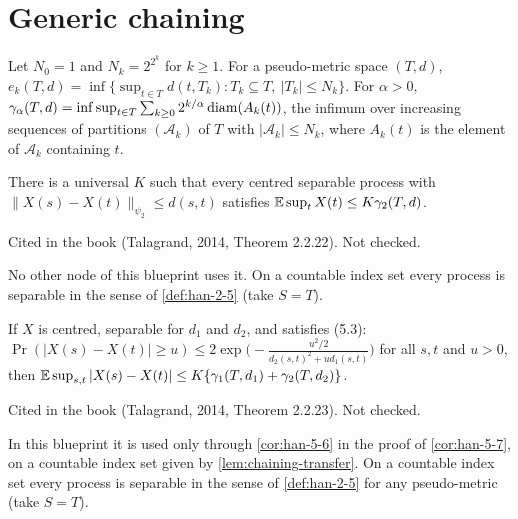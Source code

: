 \section{Generic chaining}

\begin{definition}
  \label{def:han-5-6}
  Let $N_0=1$ and $N_k=2^{2^k}$ for $k\ge1$. For a pseudo-metric space $(T,d)$, $e_k(T,d)=\inf\{\sup_{t\in T}d(t,T_k):T_k\subseteq T,\ |T_k|\le N_k\}$. For $\alpha>0$, $\gamma_\alpha(T,d)=\inf\sup_{t\in T}\sum_{k\ge0}2^{k/\alpha}\operatorname{diam}(A_k(t))$, the infimum over increasing sequences of partitions $(\mathcal A_k)$ of $T$ with $|\mathcal A_k|\le N_k$, where $A_k(t)$ is the element of $\mathcal A_k$ containing $t$.
\end{definition}

\begin{theorem}
  \label{thm:han-5-15}
  There is a universal $K$ such that every centred separable process with $\|X(s)-X(t)\|_{\psi_2}\le d(s,t)$ satisfies $\mathbb{E}\sup_tX(t)\le K\gamma_2(T,d)$.
\end{theorem}
\begin{remark}
  Cited in the book (Talagrand, 2014, Theorem 2.2.22). Not checked.

  No other node of this blueprint uses it. On a countable index set every process is separable in the sense of \cref{def:han-2-5} (take $S=T$).
\end{remark}

\begin{theorem}
  \label{thm:han-5-17}
  If $X$ is centred, separable for $d_1$ and $d_2$, and satisfies (5.3): $\Pr(|X(s)-X(t)|\ge u)\le2\exp\bigl(-\frac{u^2/2}{d_2(s,t)^2+ud_1(s,t)}\bigr)$ for all $s,t$ and $u>0$, then $\mathbb{E}\sup_{s,t}|X(s)-X(t)|\le K\{\gamma_1(T,d_1)+\gamma_2(T,d_2)\}$.
\end{theorem}
\begin{remark}
  Cited in the book (Talagrand, 2014, Theorem 2.2.23). Not checked.

  In this blueprint it is used only through \cref{cor:han-5-6} in the proof of \cref{cor:han-5-7}, on a countable index set given by \cref{lem:chaining-transfer}. On a countable index set every process is separable in the sense of \cref{def:han-2-5} for any pseudo-metric (take $S=T$).
\end{remark}

